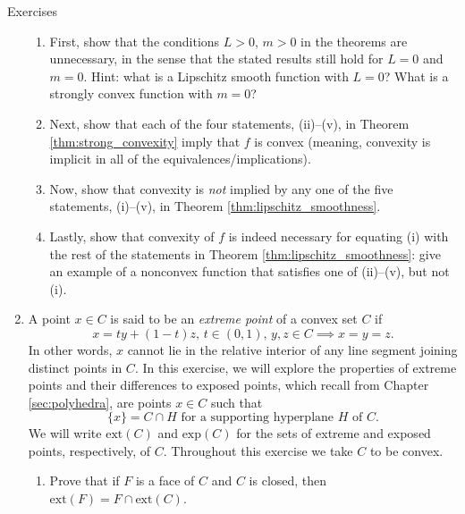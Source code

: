 \begin{xcb}{Exercises}
\begin{enumerate}[label=\thechapter.\arabic*]
\begin{enumerate}[label=\alph*.]
\item First, show that the conditions $L>0$, $m>0$ in the theorems are
  unnecessary, in the sense that the stated results still hold for $L=0$ and
  $m=0$. Hint: what is a Lipschitz smooth function with $L=0$? What is a 
  strongly convex function with $m=0$?

\item Next, show that each of the four statements, (ii)--(v), in Theorem 
  \ref{thm:strong_convexity} imply that $f$ is convex (meaning, convexity is 
  implicit in all of the equivalences/implications). 

\item Now, show that convexity is \emph{not} implied by any one of the five  
  statements, (i)--(v), in Theorem \ref{thm:lipschitz_smoothness}. 

\item Lastly, show that convexity of $f$ is indeed necessary for equating (i)
  with the rest of the statements in Theorem \ref{thm:lipschitz_smoothness}:
  give an example of a nonconvex function that satisfies one of (ii)--(v), but
  not (i).  
\end{enumerate}
 
\item \label{ex:extreme_points}
  A point $x \in C$ is said to be an \emph{extreme point} of a convex set $C$ if
  \[
  x = t y + (1-t) z, \, t \in (0,1), \, y,z \in C \implies x = y = z.
  \]
  In other words, $x$ cannot lie in the relative interior of any line segment
  joining distinct points in $C$. In this exercise, we will explore the
  properties of extreme points and their differences to exposed points, which
  recall from Chapter \ref{sec:polyhedra}, are points $x \in C$ such that  
  \[
  \text{$\{x\} = C \cap H$ for a supporting hyperplane $H$ of $C$}.
  \]
  We will write $\mathrm{ext}(C)$ and $\mathrm{exp}(C)$ for the sets of extreme
  and exposed points, respectively, of $C$. Throughout this exercise we take $C$ 
  to be convex.

\begin{enumerate}[label=\alph*.]
\item Prove that if $F$ is a face of $C$ and $C$ is closed, then
  $\mathrm{ext}(F) = F \cap \mathrm{ext}(C)$. 


\end{enumerate}
\end{enumerate}
\end{xcb}
